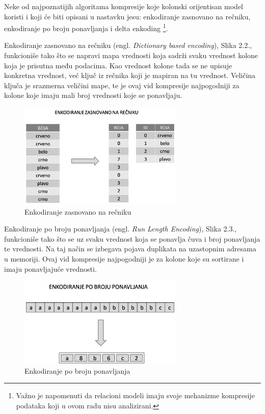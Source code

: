 \documentclass[12pt,oneside]{memoir}
\begin{document}
Neke od najpoznatijih algoritama kompresije koje kolonski orijentisan model koristi i koji će biti opisani u nastavku jesu: enkodiranje zasnovano na rečniku, enkodiranje po broju ponavljanja i delta enkoding \cite{ColumnarOptimizations}\footnote{Važno je napomenuti da relacioni modeli imaju svoje mehanizme kompresije podataka koji u ovom radu nisu analizirani.}.

Enkodiranje zasnovano na rečniku (engl. \textit{Dictionary based encoding}), Slika 2.2., funkcioniše tako što se napravi mapa vrednosti koja sadrži svaku vrednost kolone koja je prisutna među podacima. Kao vrednost kolone tada se ne upisuje konkretna vrednost, već ključ iz rečnika koji je mapiran na tu vrednost. Veličina ključa je srazmerna veličini mape, te je ovaj vid kompresije najpogodniji za kolone koje imaju mali broj vrednosti koje se ponavljaju.

\begin{figure}[!ht]
  \centering
  \includegraphics[width=0.7\textwidth]{DictionaryEncoding.png}
  \caption{Enkodiranje zasnovano na rečniku}
  \label{fig:grafikon}
\end{figure}


Enkodiranje po broju ponavljanja  (engl. \textit{Run Length Encoding}), Slika 2.3., funkcioniše tako što se uz svaku vrednost koja se ponavlja čuva i broj ponavljanja te vrednosti. Na taj način se izbegava pojava duplikata na uzastopnim adresama u memoriji. Ovaj vid kompresije najpogodniji je za kolone koje su sortirane i imaju ponavljajuće vrednosti.

\begin{figure}[!ht]
  \centering
  \includegraphics[width=0.7\textwidth]{run-length-encoding.png}
  \caption{Enkodiranje po broju ponavljanja}
  \label{fig:grafikon}
\end{figure}
\end{document}
